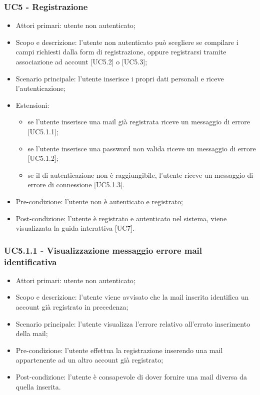 \subsubsection{UC5 - Registrazione}
\begin{itemize}
	\item  Attori primari: utente non autenticato;
	\item Scopo e descrizione: l'utente non autenticato può scegliere se compilare i campi richiesti dalla form di registrazione, oppure registrarsi tramite associazione ad account  [UC5.2] o  [UC5.3];
	\item  Scenario principale: l'utente inserisce i propri dati personali e riceve l'autenticazione;
	\item  Estensioni: 
		   \begin{itemize}
				\item se l'utente inserisce una mail già registrata riceve un messaggio di errore [UC5.1.1];
				\item se l'utente inserisce una password non valida riceve un messaggio di errore [UC5.1.2];
				\item se il  di autenticazione non è raggiungibile, l'utente riceve un messaggio di errore di connessione [UC5.1.3].
		   \end{itemize}
	\item  Pre-condizione: l'utente non è autenticato e registrato;
	\item  Post-condizione: l'utente è registrato e autenticato nel sistema, viene visualizzata la guida interattiva [UC7].
\end{itemize}
\subsubsection{UC5.1.1 - Visualizzazione messaggio errore mail identificativa}
\begin{itemize}
	\item  Attori primari: utente non autenticato;
	\item  Scopo e descrizione: l'utente viene avvisato che la mail inserita identifica un account già registrato in precedenza;
	\item  Scenario principale: l'utente visualizza l'errore relativo all'errato inserimento della mail;
	\item  Pre-condizione: l'utente effettua la registrazione inserendo una mail appartenente ad un altro account già registrato;
	\item  Post-condizione: l'utente è consapevole di dover fornire una mail diversa da quella inserita.
\end{itemize}

